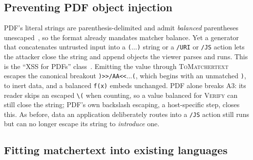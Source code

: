\subsection{Preventing PDF object injection}
\label{sec:resist:pdf}

PDF's literal strings are parenthesis-delimited and admit \emph{balanced}
parentheses unescaped~\cite{iso32000}, so the format already mandates matcher
balance.
Yet a generator that concatenates untrusted input into a
\verb|(|$\dots$\verb|)| string or a \verb|/URI| or \verb|/JS| action lets the
attacker close the string and append objects the viewer parses and runs.
This is the ``XSS for PDFs'' class~\cite{heyes20pdf}.
Emitting the value through \textsc{ToMatchertext} escapes the canonical breakout
\verb|)>>/AA<<|$\dots$\verb|(|, which begins with an unmatched \verb|)|, to inert
data, and a balanced \verb|f(x)| embeds unchanged.
PDF alone breaks A3: its reader skips an escaped \verb|\(| when counting, so a
value balanced for \textsc{Verify} can still close the string; PDF's own
backslash escaping, a host-specific step, closes this.
As before, data an application deliberately routes into a \verb|/JS| action still
runs but can no longer escape its string to \emph{introduce} one.

\subsection{Fitting matchertext into existing languages}
\label{sec:resist:fitting}


